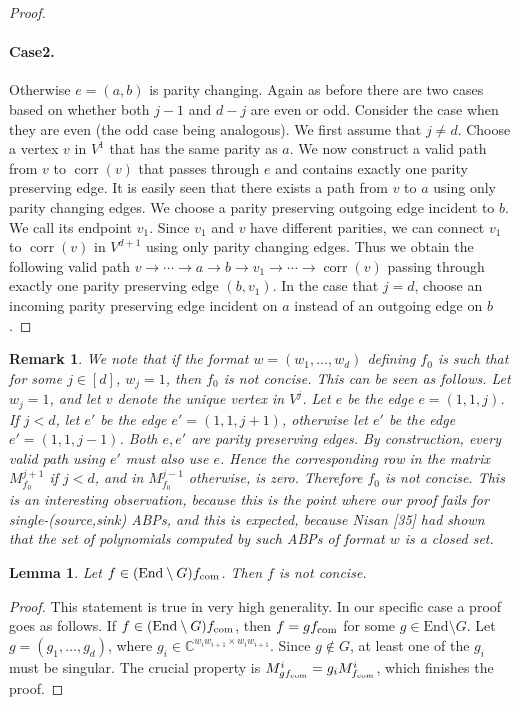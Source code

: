 \documentclass[10pt,a4paper]{article}
\newtheorem{lemma}[theorem]{Lemma}
\newtheorem{remark}[theorem]{Remark}
\newcommand{\C}{\mathbb C}
\newcommand{\fcom}{f_{\rm com}}
\newcommand{\End}{\mathrm{End}}
\begin{document}
\begin{proof}
\paragraph{Case2.} Otherwise $e=(a,b)$ is parity changing. Again as before there are two cases based on whether both $j-1$ and $d-j$ are even or odd. Consider the case when they are even (the odd case being analogous). We first assume that $j\ne d$. Choose a vertex $v$ in $V^1$ that has the same parity as $a$. We now construct a valid path from $v$ to $\operatorname{corr}(v)$ that passes through $e$ and contains exactly one parity preserving edge. It is easily seen that there exists a path from $v$ to $a$ using only parity changing edges. We choose a parity preserving outgoing edge incident to $b$. We call its endpoint $v_1$. Since $v_1$ and $v$ have different parities, we can connect $v_1$ to $\operatorname{corr}(v)$ in $V^{d+1}$ using only parity changing edges. Thus we obtain the following valid path $v\to\cdots\to a\to b\to v_1\to\cdots\to\operatorname{corr}(v)$ passing through exactly one parity preserving edge $(b,v_1)$. In the case that $j=d$, choose an incoming parity preserving edge incident on $a$ instead of an outgoing edge on $b$.
\end{proof}
\begin{remark}
We note that if the format $w=(w_1,\ldots,w_d)$ defining $f_0$ is such that for some $j\in[d]$, $w_j=1$, then $f_0$ is not concise. This can be seen as follows.
Let $w_j=1$, and let $v$ denote the unique vertex in $V^j$. Let $e$ be the edge $e=(1,1,j)$. If $j<d$, let $e'$ be the edge $e'=(1,1,j+1)$, otherwise let $e'$ be the edge $e'=(1,1,j-1)$. Both $e,e'$ are parity preserving edges. By construction, every valid path using $e'$ must also use $e$. Hence the corresponding row in the matrix $M^{j+1}_{f_0}$ if $j<d$, and in $M^{j-1}_{f_0}$ otherwise, is zero. Therefore $f_0$ is not concise.
This is an interesting observation, because this is the point where our proof fails for single-(source,sink) ABPs, and this is expected, because Nisan [35] had shown that the set of polynomials computed by such ABPs of format $w$ is a closed set.
\end{remark}
\begin{lemma}Let $f\in(\End\setminus G)\fcom$. Then $f$ is not concise.\end{lemma}
\begin{proof}
This statement is true in very high generality. In our specific case a proof goes as follows. If $f\in(\End\setminus G)\fcom$, then $f=g\fcom$ for some $g\in\End\setminus G$. Let $g=(g_1,\ldots,g_d)$, where $g_i\in\C^{w_iw_{i+1}\times w_iw_{i+1}}$. Since $g\notin G$, at least one of the $g_i$ must be singular. The crucial property is $M^i_{g\fcom}=g_iM^i_{\fcom}$, which finishes the proof.
\end{proof}
\end{document}
